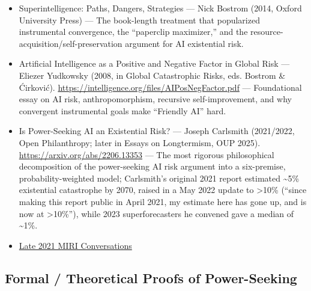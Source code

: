 \documentclass[11pt]{article}
\begin{document}
\begin{itemize}
  \item Superintelligence: Paths, Dangers, Strategies --- Nick Bostrom (2014, Oxford University Press) --- The book-length treatment that popularized instrumental convergence, the ``paperclip maximizer,'' and the resource-acquisition/self-preservation argument for AI existential risk.
  \item Artificial Intelligence as a Positive and Negative Factor in Global Risk --- Eliezer Yudkowsky (2008, in Global Catastrophic Risks, eds. Bostrom \& Ćirković). \url{https://intelligence.org/files/AIPosNegFactor.pdf} --- Foundational essay on AI risk, anthropomorphism, recursive self-improvement, and why convergent instrumental goals make ``Friendly AI'' hard.
  \item Is Power-Seeking AI an Existential Risk? --- Joseph Carlsmith (2021/2022, Open Philanthropy; later in Essays on Longtermism, OUP 2025). \url{https://arxiv.org/abs/2206.13353} --- The most rigorous philosophical decomposition of the power-seeking AI risk argument into a six-premise, probability-weighted model; Carlsmith's original 2021 report estimated \textasciitilde{}5\% existential catastrophe by 2070, raised in a May 2022 update to >10\% (``since making this report public in April 2021, my estimate here has gone up, and is now at >10\%''), while 2023 superforecasters he convened gave a median of \textasciitilde{}1\%.
  \item \href{https://intelligence.org/late-2021-miri-conversations/}{Late 2021 MIRI Conversations}
\end{itemize}

\subsection*{Formal / Theoretical Proofs of Power-Seeking}
\end{document}
